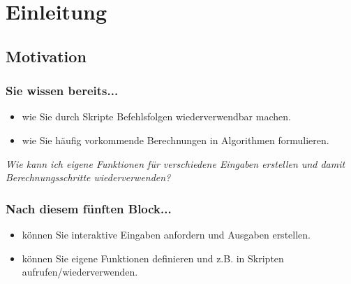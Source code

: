 



\setcounter{mchapter}{5}
\setcounter{mexercise}{0}


  

  \section{Einleitung}

  \subsection{Motivation}
  \begin{frame}
      \frametitle{Sie wissen bereits...}
      \begin{itemize}
          \item wie Sie durch Skripte Befehlsfolgen wiederverwendbar machen.
          \item wie Sie häufig vorkommende Berechnungen in Algorithmen formulieren.
      \end{itemize}

      \textit{Wie kann ich eigene Funktionen für verschiedene Eingaben erstellen und damit Berechnungsschritte wiederverwenden?}
  \end{frame}

  \begin{frame}
      \frametitle{Nach diesem fünften Block...}
      \begin{itemize}
          \item können Sie interaktive Eingaben anfordern und Ausgaben erstellen.
          \item können Sie eigene Funktionen definieren und z.B. in Skripten aufrufen/wiederverwenden.
      \end{itemize}
  \end{frame}

